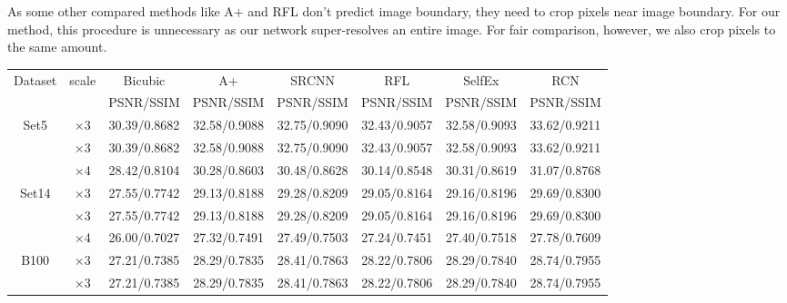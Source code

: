 \documentclass[10pt,twocolumn,letterpaper]{article}
\begin{document}
As  some other compared methods like A+ \cite{Timofte} and  RFL \cite{schulter2015fast} don't predict image boundary, they need to crop pixels near image boundary. For our method, this procedure is unnecessary as our network super-resolves an entire image. For fair comparison, however, we also crop pixels to the same amount. \footnotemark{}


\begin{table}
\begin{center}
\setlength{\tabcolsep}{2pt}
\footnotesize
\begin{tabular}{ | c | c | c | c | c | c | c | c | }
\hline
\multirow{2}{*}{Dataset} & \multirow{2}{*}{scale} & Bicubic & A+ & SRCNN & RFL & SelfEx & RCN\\
 & & PSNR/SSIM & PSNR/SSIM & PSNR/SSIM & PSNR/SSIM & PSNR/SSIM & PSNR/SSIM\\
\hline
\hline
\multirow{3}{*}{Set5} & $\times$3 & 30.39/0.8682 & 32.58/0.9088 & {\color{blue}32.75}/0.9090 & 32.43/0.9057 & 32.58/{\color{blue}0.9093} & {\color{red}33.62}/{\color{red}0.9211}\\
 & $\times$3 & 30.39/0.8682 & 32.58/0.9088 & {\color{blue}32.75}/0.9090 & 32.43/0.9057 & 32.58/{\color{blue}0.9093} & {\color{red}33.62}/{\color{red}0.9211}\\
 & $\times$4 & 28.42/0.8104 & 30.28/0.8603 & {\color{blue}30.48}/{\color{blue}0.8628} & 30.14/0.8548 & 30.31/0.8619 & {\color{red}31.07}/{\color{red}0.8768}\\
\hline
\hline
\multirow{3}{*}{Set14} & $\times$3 & 27.55/0.7742 & 29.13/0.8188 & {\color{blue}29.28}/{\color{blue}0.8209} & 29.05/0.8164 & 29.16/0.8196 & {\color{red}29.69}/{\color{red}0.8300}\\
 & $\times$3 & 27.55/0.7742 & 29.13/0.8188 & {\color{blue}29.28}/{\color{blue}0.8209} & 29.05/0.8164 & 29.16/0.8196 & {\color{red}29.69}/{\color{red}0.8300}\\
 & $\times$4 & 26.00/0.7027 & 27.32/0.7491 & {\color{blue}27.49}/0.7503 & 27.24/0.7451 & 27.40/{\color{blue}0.7518} & {\color{red}27.78}/{\color{red}0.7609}\\
\hline
\hline
\multirow{3}{*}{B100} & $\times$3 & 27.21/0.7385 & 28.29/0.7835 & {\color{blue}28.41}/{\color{blue}0.7863} & 28.22/0.7806 & 28.29/0.7840 & {\color{red}28.74}/{\color{red}0.7955}\\
 & $\times$3 & 27.21/0.7385 & 28.29/0.7835 & {\color{blue}28.41}/{\color{blue}0.7863} & 28.22/0.7806 & 28.29/0.7840 & {\color{red}28.74}/{\color{red}0.7955}\\

\end{tabular}
\end{center}
\end{table}
\end{document}
